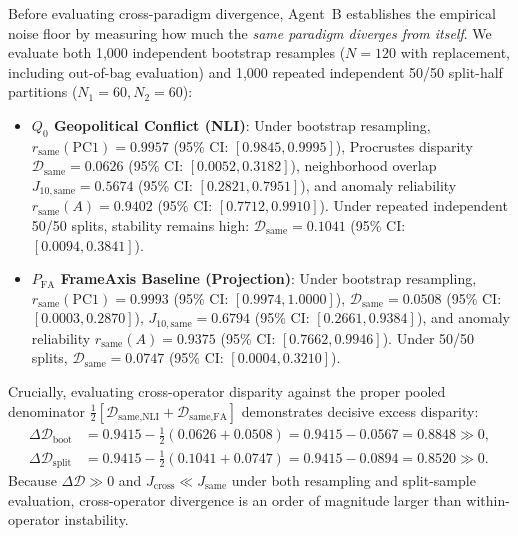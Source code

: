 Before evaluating cross-paradigm divergence, Agent~B establishes the empirical noise floor by measuring how much the \emph{same paradigm diverges from itself}. We evaluate both 1,000 independent bootstrap resamples ($N=120$ with replacement, including out-of-bag evaluation) and 1,000 repeated independent 50/50 split-half partitions ($N_1 = 60, N_2 = 60$):
\begin{itemize}
    \item \textbf{$Q_0$ Geopolitical Conflict (NLI)}: Under bootstrap resampling, $r_{\text{same}}(\mathrm{PC1}) = \mathbf{0.9957}$ (95\% CI: $[0.9845, 0.9995]$), Procrustes disparity $\mathcal{D}_{\text{same}} = \mathbf{0.0626}$ (95\% CI: $[0.0052, 0.3182]$), neighborhood overlap $J_{10,\text{same}} = \mathbf{0.5674}$ (95\% CI: $[0.2821, 0.7951]$), and anomaly reliability $r_{\text{same}}(A) = \mathbf{0.9402}$ (95\% CI: $[0.7712, 0.9910]$). Under repeated independent 50/50 splits, stability remains high: $\mathcal{D}_{\text{same}} = \mathbf{0.1041}$ (95\% CI: $[0.0094, 0.3841]$).
    \item \textbf{$P_{\text{FA}}$ FrameAxis Baseline (Projection)}: Under bootstrap resampling, $r_{\text{same}}(\mathrm{PC1}) = \mathbf{0.9993}$ (95\% CI: $[0.9974, 1.0000]$), $\mathcal{D}_{\text{same}} = \mathbf{0.0508}$ (95\% CI: $[0.0003, 0.2870]$), $J_{10,\text{same}} = \mathbf{0.6794}$ (95\% CI: $[0.2661, 0.9384]$), and anomaly reliability $r_{\text{same}}(A) = \mathbf{0.9375}$ (95\% CI: $[0.7662, 0.9946]$). Under 50/50 splits, $\mathcal{D}_{\text{same}} = \mathbf{0.0747}$ (95\% CI: $[0.0004, 0.3210]$).
\end{itemize}
Crucially, evaluating cross-operator disparity against the proper pooled denominator $\frac{1}{2}[\mathcal{D}_{\text{same,NLI}} + \mathcal{D}_{\text{same,FA}}]$ demonstrates decisive excess disparity:
\begin{equation}
\begin{aligned}
    \Delta \mathcal{D}_{\text{boot}} &= 0.9415 - \frac{1}{2}(0.0626 + 0.0508) = 0.9415 - 0.0567 = \mathbf{0.8848} \gg 0, \\
    \Delta \mathcal{D}_{\text{split}} &= 0.9415 - \frac{1}{2}(0.1041 + 0.0747) = 0.9415 - 0.0894 = \mathbf{0.8520} \gg 0.
\end{aligned}
\end{equation}
Because $\Delta \mathcal{D} \gg 0$ and $J_{\text{cross}} \ll J_{\text{same}}$ under both resampling and split-sample evaluation, cross-operator divergence is an order of magnitude larger than within-operator instability.

